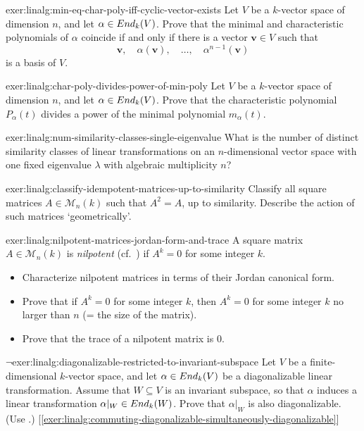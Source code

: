 \begin{exer}{}{exer:linalg:min-eq-char-poly-iff-cyclic-vector-exists}
  Let $V$ be a $k$-vector space of dimension $n$, and let $\alpha \in
  End_k(V)$. Prove that the minimal and characteristic polynomials of
  $\alpha$ coincide if and only if there is a vector
  $\mathbf{v} \in V$ such that
  \[
    \mathbf{v}, \quad \alpha(\mathbf{v}), \quad \dots, \quad
    \alpha^{n-1}(\mathbf{v})
  \]
  is a basis of $V$.
\end{exer}
\begin{exer}{}{exer:linalg:char-poly-divides-power-of-min-poly}
  Let $V$ be a $k$-vector space of dimension $n$, and let $\alpha \in
  End_k(V)$. Prove that the characteristic polynomial $P_\alpha(t)$
  divides a power of the minimal polynomial $m_\alpha(t)$.
\end{exer}
\begin{exer}{}{exer:linalg:num-similarity-classes-single-eigenvalue}
  What is the number of distinct similarity classes of linear
  transformations on an $n$-dimensional vector space with one fixed
  eigenvalue $\lambda$ with algebraic multiplicity $n$?
\end{exer}
\begin{exer}{}{exer:linalg:classify-idempotent-matrices-up-to-similarity}
  Classify all square matrices $A \in \mathcal{M}_n(k)$ such that
  $A^2 = A$, up to similarity. Describe the action of such matrices
  `geometrically'.
\end{exer}
\begin{exer}{}{exer:linalg:nilpotent-matrices-jordan-form-and-trace}
  A square matrix $A \in \mathcal{M}_n(k)$ is \emph{nilpotent} (cf.\
  ) if $A^k = 0$ for
  some integer $k$.
  \begin{itemize}
  \item Characterize nilpotent matrices in terms of their Jordan
    canonical form.
  \item Prove that if $A^k = 0$ for some integer $k$, then $A^k = 0$
    for some integer $k$ no larger than $n$ (= the size of the
    matrix).
  \item Prove that the trace of a nilpotent matrix is $0$.
  \end{itemize}
\end{exer}
\begin{exer}{$\lnot$}{exer:linalg:diagonalizable-restricted-to-invariant-subspace}
  Let $V$ be a finite-dimensional $k$-vector space, and let
  $\alpha \in
  End_k(V)$ be a diagonalizable linear transformation.  Assume that
  $W \subseteq V$ is an invariant subspace, so that $\alpha$ induces a
  linear transformation $\alpha|_W \in End_k(W)$.  Prove that
  $\alpha|_W$ is also diagonalizable. (Use
  .)
  [\ref{exer:linalg:commuting-diagonalizable-simultaneously-diagonalizable}]
\end{exer}

